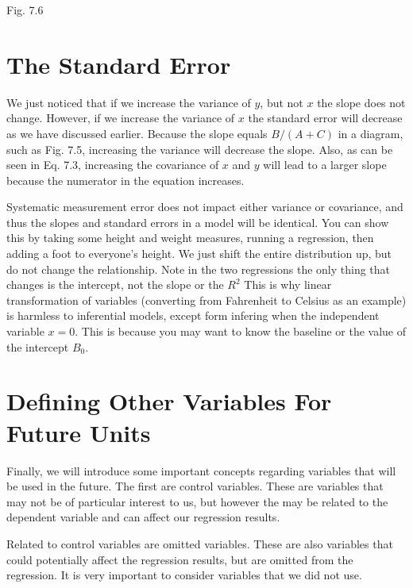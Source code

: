 \documentclass[]{book}
\theoremstyle{definition}
\theoremstyle{definition}
\theoremstyle{definition}
\theoremstyle{remark}
\begin{document}
Fig. 7.6

\hypertarget{the-standard-error-1}{%
\section{The Standard Error}\label{the-standard-error-1}}

We just noticed that if we increase the variance of \(y\), but not \(x\)
the slope does not change. However, if we increase the variance of \(x\)
the standard error will decrease as we have discussed earlier. Because
the slope equals \(B/(A+C)\) in a diagram, such as Fig. 7.5, increasing
the variance will decrease the slope. Also, as can be seen in Eq. 7.3,
increasing the covariance of \(x\) and \(y\) will lead to a larger slope
because the numerator in the equation increases.

Systematic measurement error does not impact either variance or
covariance, and thus the slopes and standard errors in a model will be
identical. You can show this by taking some height and weight measures,
running a regression, then adding a foot to everyone's height. We just
shift the entire distribution up, but do not change the relationship.
Note in the two regressions the only thing that changes is the
intercept, not the slope or the \(R^2\) This is why linear
transformation of variables (converting from Fahrenheit to Celsius as an
example) is harmless to inferential models, except form infering when
the independent variable \(x=0\). This is because you may want to know
the baseline or the value of the intercept \(B_0\).

\hypertarget{defining-other-variables-for-future-units}{%
\section{Defining Other Variables For Future
Units}\label{defining-other-variables-for-future-units}}

Finally, we will introduce some important concepts regarding variables
that will be used in the future. The first are control variables. These
are variables that may not be of particular interest to us, but however
the may be related to the dependent variable and can affect our
regression results.

Related to control variables are omitted variables. These are also
variables that could potentially affect the regression results, but are
omitted from the regression. It is very important to consider variables
that we did not use.
\end{document}
